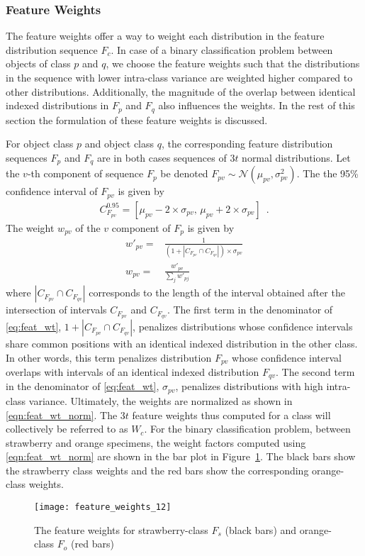\subsubsection{Feature Weights}
\label{sec:distdes_feat_wts}

The feature weights offer a way to weight each distribution in the feature distribution sequence $F_c$. In case of a binary classification problem between objects of class $p$ and $q$, we choose the feature weights such that the distributions in the sequence with lower intra-class variance are weighted higher compared to other distributions. Additionally, the magnitude of the overlap between identical indexed distributions in $F_p$ and $F_q$ also influences the weights. In the rest of this section the formulation of these feature weights is discussed.

For object class $p$ and object class $q$, the corresponding feature distribution sequences $F_p$ and $F_q$ are in both cases sequences of $3t$ normal distributions. Let the $v$-th component of sequence $F_p$ be denoted $F_{pv}\sim\mathcal{N}(\mu_{pv},\sigma^2_{pv})$.
The the 95\% confidence interval of $F_{pv}$ is given by
%
\begin{align}	\label{eqn:conf_interval}
C^{0.95}_{F_{pv}}=[\mu_{pv}-2 \times \sigma_{pv},\, \mu_{pv}+2 \times \sigma_{pv}]\enspace .
\end{align}
%
The weight $w_{pv}$ of the $v$ component of $F_p$ is given by
\begin{align}
 w'_{pv}= & \frac{1}{(1+ |C_{F_{pv}} \cap C_{F_{qv}}| )\times \sigma_{pv}} \label{eq:feat_wt}\\
 w_{pv}= & \frac{w'_{pv}}{\sum_{j} w'_{pj}} \label{eqn:feat_wt_norm}
\end{align}
where $|C_{F_{pv}} \cap C_{F_{qv}}|$ corresponds to the length of the interval obtained after the intersection of intervals $C_{F_{pv}}$ and $C_{F_{qv}}$. The first term in the denominator of \eqref{eq:feat_wt}, $1+ |C_{F_{pv}} \cap C_{F_{qv}}|$, penalizes distributions whose confidence intervals share common positions with an identical indexed distribution in the other class. In other words, this term penalizes distribution $F_{pv}$ whose confidence interval overlaps with intervals of an identical indexed distribution $F_{qv}$. The second term in the denominator of \eqref{eq:feat_wt}, $\sigma_{pv}$, penalizes distributions with high intra-class variance. Ultimately, the weights are normalized as shown in \eqref{eqn:feat_wt_norm}. The $3t$ feature weights thus computed for a class will collectively be referred to as $W_c$. For the binary classification problem, between strawberry and orange specimens, the weight factors computed using \eqref{eqn:feat_wt_norm} are shown in the bar plot in Figure~\ref{fig:feat_weights}. The black bars show the strawberry 
class 
weights and the red 
bars show the corresponding orange-class weights.
%
\begin{figure}
  \centering
  \texttt{[image: feature\_weights\_12]}
  \caption[Feature weights]{The feature weights for strawberry-class $F_s$ (black bars) and orange-class $F_o$ (red bars)}
  \label{fig:feat_weights}
\end{figure}	
%

